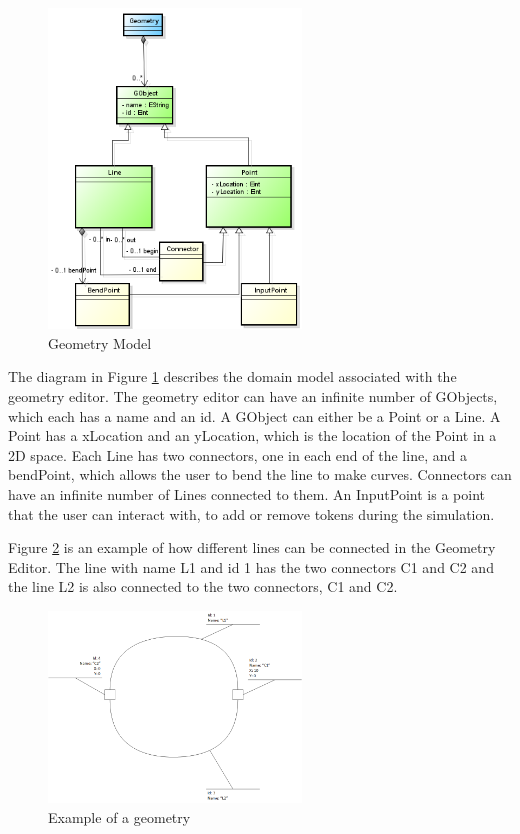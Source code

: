 \documentclass[11pt]{article}   %
\begin{document}
\begin{figure}[htp]
\begin{center}
  \includegraphics[width=0.6\textwidth]{image/geometry_model.png}
  \caption{Geometry Model}
  \label{fig:geometry_model}
\end{center}
\end{figure}

The diagram in Figure \ref{fig:geometry_model} describes the domain model associated with the geometry editor. The geometry editor can have an infinite number of GObjects, which each has a name and an id. A GObject can either be a Point or a Line. A Point has a xLocation and an yLocation, which is the location of the Point in a 2D space.
Each Line has two connectors, one in each end of the line, and a bendPoint, which allows the user to bend the line to make curves. Connectors can have an infinite number of Lines connected to them. An InputPoint is a point that the user can interact with, to add or remove tokens during the simulation. 

Figure \ref{fig:extended_petrinet_geometry} is an example of how different lines can be connected in the Geometry Editor. The line with name L1 and id 1 has the two connectors C1 and C2 and the line L2 is also connected to the two connectors, C1 and C2. 


\begin{figure}[htp]
\begin{center}
  \includegraphics[width=0.6\textwidth]{image/example_petrinet_geometry.png}
  \caption{Example of a geometry}
  \label{fig:extended_petrinet_geometry}
\end{center}
\end{figure}
\end{document}
